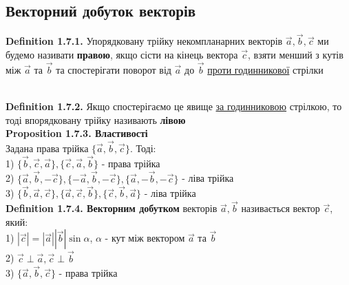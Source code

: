 \documentclass[a4paper, 14pt]{extarticle}
\def\defin#1{\textbf{Definition {#1}}}
\def\prp#1{\textbf{Proposition {#1}}}
\def\bigline{\vspace{5mm}\\}
\begin{document}
	\subsection{Векторний добуток векторів}
	\defin{1.7.1.} Упорядковану трійку некомпланарних векторів $\vec{a}, \vec{b}, \vec{c}$ ми будемо називати \textbf{правою}, якщо сісти на кінець вектора $\vec{c}$, взяти менший з кутів між $\vec{a}$ та $\vec{b}$ та спостерігати поворот від $\vec{a}$ до $\vec{b}$ \underline{проти годинникової} стрілки\\
\bigline
	\defin{1.7.2.} Якщо спостерігаємо це явище \underline{за годинниковою} стрілкою, то тоді впорядковану трійку називають \textbf{лівою}
	\bigline
	\prp{1.7.3. Властивості}\\
	Задана права трійка $\{\vec{a}, \vec{b}, \vec{c}\}$. Тоді:\\
	1) $\{\vec{b}, \vec{c}, \vec{a}\}, \{\vec{c}, \vec{a}, \vec{b}\}$ - права трійка\\
	2) $\{\vec{a}, \vec{b}, -\vec{c}\}, \{-\vec{a}, \vec{b}, -\vec{c}\}, \{\vec{a}, -\vec{b}, -\vec{c}\}$ - ліва трійка\\
	3) $\{\vec{b}, \vec{a}, \vec{c}\}, \{\vec{a}, \vec{c}, \vec{b}\}, \{\vec{c}, \vec{b}, \vec{a}\}$ - ліва трійка
	\bigline
	\defin{1.7.4. Векторним добутком} векторів $\vec{a}, \vec{b}$ називається вектор $\vec{c}$, який:\\
	1) $|\vec{c}| = |\vec{a}| |\vec{b}| \sin \alpha$, $\alpha$ - кут між вектором $\vec{a}$ та $\vec{b}$\\
	2) $\vec{c} \perp \vec{a}, \vec{c} \perp \vec{b}$\\
	3) $\{\vec{a}, \vec{b}, \vec{c}\}$ - права трійка\\
\\
\end{document}
